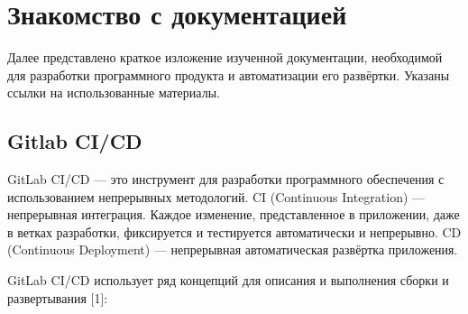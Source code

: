 \documentclass[a4paper,14pt]{extreport}
\begin{document}
		\chapter{Знакомство с документацией}
		Далее представлено краткое изложение изученной документации, 
		необходимой для разработки программного продукта и автоматизации его 
		развёртки. Указаны ссылки на использованные материалы.
		\section{Gitlab CI/CD}
		GitLab CI/CD — это инструмент для разработки программного обеспечения с 		использованием непрерывных методологий. CI (Continuous Integration) — 				непрерывная интеграция. Каждое изменение, 
		представленное в приложении, даже в ветках разработки, фиксируется и 
		тестируется автоматически и непрерывно. CD (Continuous Deployment) —
		непрерывная автоматическая развёртка приложения.
		\par GitLab CI/CD использует ряд концепций для описания и выполнения 
сборки и развертывания [1]:
\end{document}
